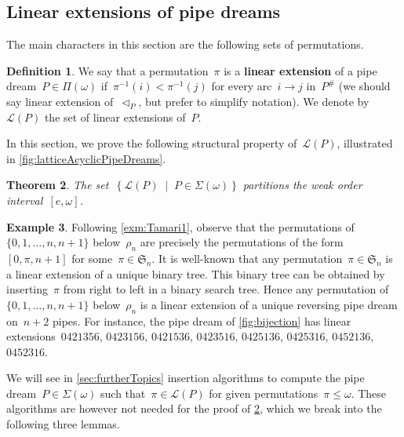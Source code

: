 \documentclass[reqno]{amsart}
\newtheorem{theorem}{Theorem}[section]
\theoremstyle{definition}
\newtheorem{definition}[theorem]{Definition}
\newtheorem{example}[theorem]{Example}
\newcommand{\set}[2]{\left\{ #1 \;\middle|\; #2 \right\}} %
\newcommand{\defn}[1]{\textbf{\textsf{\color{PineGreen} #1}}} %
\newcommand{\fS}{\mathfrak{S}} %
\newcommand{\pipeDreams}{\Pi} %
\newcommand{\contact}{^\#} %
\newcommand{\acyclicPipeDreams}{\Sigma} %
\newcommand{\linearExtensions}{\mathcal{L}} %
\newcommand{\less}{\vartriangleleft} %
\newcommand{\contactLess}[1]{\less_{#1}} %
\begin{document}
\subsection{Linear extensions of pipe dreams}
\label{subsec:linearExtensions}

The main characters in this section are the following sets of permutations.

\begin{definition}
\label{def:linearExtensions}
We say that a permutation~$\pi$ is a \defn{linear extension} of a pipe dream~$P \in \pipeDreams(\omega)$ if~$\pi^{-1}(i) < \pi^{-1}(j)$ for every arc~$i \to j$ in~$P\contact$ (we should say linear extension of~$\contactLess{P}$, but prefer to simplify notation).
We denote by~$\linearExtensions(P)$ the set of linear extensions of~$P$.
\end{definition}

In this section, we prove the following structural property of~$\linearExtensions(P)$, illustrated in \cref{fig:latticeAcyclicPipeDreams}.

\begin{theorem}
\label{thm:partitionPipeDreams}
The set~$\set{\linearExtensions(P)}{P \in \acyclicPipeDreams(\omega)}$ partitions the weak order interval~$[e,\omega]$.
\end{theorem}

\begin{example}
\label{exm:Tamari2}
Following \cref{exm:Tamari1}, observe that the permutations of~$\{0, 1, \dots, n, n+1\}$ below~$\rho_n$ are precisely the permutations of the form~$[0, \pi, n+1]$ for some~$\pi \in \fS_n$.
It is well-known that any permutation~$\pi \in \fS_n$ is a linear extension of a unique binary tree.
This binary tree can be obtained by inserting~$\pi$ from right to left in a binary search tree.
Hence any permutation of~$\{0, 1, \dots, n, n+1\}$ below~$\rho_n$ is a linear extension of a unique reversing pipe dream on~$n+2$ pipes.
For instance, the pipe dream of \cref{fig:bijection} has linear extensions~$0421356$, $0423156$, $0421536$, $0423516$, $0425136$, $0425316$, $0452136$, $0452316$.
\end{example}

We will see in \cref{sec:furtherTopics} insertion algorithms to compute the pipe dream~$P \in \acyclicPipeDreams(\omega)$ such that~$\pi \in \linearExtensions(P)$ for given permutations~$\pi \le \omega$.
These algorithms are however not needed for the proof of \cref{thm:partitionPipeDreams}, which we break into the following three lemmas.
\end{document}
